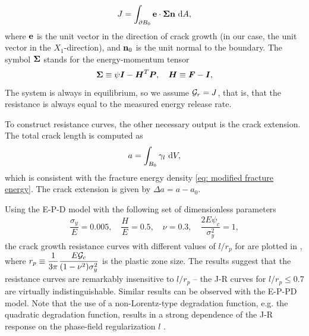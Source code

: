 \begin{equation}
  \label{eq:J_integral}
  J = \int_{\partial B_0} \textbf{e} \cdot \boldsymbol{\Sigma} \textbf{n} \text{ d}A,
\end{equation}
where $\textbf{e}$ is the unit vector in the direction of crack growth (in our case, the unit vector in the $X_1$-direction), and $\textbf{n}_0$ is the unit normal to the boundary.
The symbol $\boldsymbol{\Sigma}$ stands for the energy-momentum tensor
\begin{equation}
  \boldsymbol{\Sigma} \equiv \psi \boldsymbol{I} - \boldsymbol{H}^T \boldsymbol{P}, \quad \boldsymbol{H} \equiv \boldsymbol{F} - \boldsymbol{I},
\end{equation}
The system is always in equilibrium, so we assume ${\mathcal{G}_r} = J$, that is, that the resistance is always equal to the measured energy release rate.

To construct resistance curves, the other necessary output is the crack extension. The total crack length is computed as
\begin{equation}
  \label{eq:crack_length_definition}
  a = \int_{B_0} \gamma_l \text{ d}V,
\end{equation}
which is consistent with the fracture energy density \eqref{eq: modified fracture energy}.
The crack extension is given by $\Delta a = a - a_0$.



Using the E-P-D model with the following set of dimensionless parameters
\begin{align}
  \dfrac{\sigma_y}{E} = 0.005, \quad \dfrac{H}{E} = 0.5, \quad \nu = 0.3, \quad \dfrac{2E\psi_c}{\sigma_y^2} = 1,
\end{align}
the crack growth resistance curves with different values of $l/r_p$ for are plotted in , where $r_p \equiv \dfrac{1}{3\pi}\dfrac{E{\mathcal{G}_c}}{(1-\nu^2)\sigma_y^2}$ is the plastic zone size. The results suggest that the resistance curves are remarkably insensitive to $l/r_p$ -- the J-R curves for $l/r_p \leq 0.7$ are virtually indistinguishable. Similar results can be observed with the E-P-PD model. Note that the use of a non-Lorentz-type degradation function, e.g. the quadratic degradation function, results in a strong dependence of the J-R response on the phase-field regularization $l$ \cite{brandon2020cohesive}.
